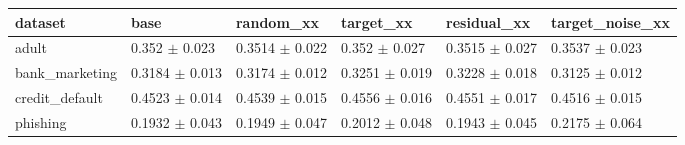 \begin{tabular}{llllll}
\toprule
dataset & base & random\_xx & target\_xx & residual\_xx & target\_noise\_xx \\
\midrule
adult & 0.352 $\pm$ 0.023 & 0.3514 $\pm$ 0.022 & 0.352 $\pm$ 0.027 & 0.3515 $\pm$ 0.027 & 0.3537 $\pm$ 0.023 \\
bank\_marketing & 0.3184 $\pm$ 0.013 & 0.3174 $\pm$ 0.012 & 0.3251 $\pm$ 0.019 & 0.3228 $\pm$ 0.018 & 0.3125 $\pm$ 0.012 \\
credit\_default & 0.4523 $\pm$ 0.014 & 0.4539 $\pm$ 0.015 & 0.4556 $\pm$ 0.016 & 0.4551 $\pm$ 0.017 & 0.4516 $\pm$ 0.015 \\
phishing & 0.1932 $\pm$ 0.043 & 0.1949 $\pm$ 0.047 & 0.2012 $\pm$ 0.048 & 0.1943 $\pm$ 0.045 & 0.2175 $\pm$ 0.064 \\
\bottomrule
\end{tabular}
